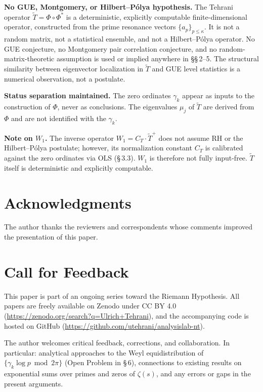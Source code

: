 \documentclass[11pt]{article}
\newcommand{\Tt}{\widetilde{T}}
\newcommand{\CT}{C_{T}}
\newcommand{\Wone}{W_1}
\begin{document}
\textbf{No GUE, Montgomery, or Hilbert--P\'olya hypothesis.}
The Tehrani operator $\Tt = \Phi\circ\Phi^*$ is a deterministic,
explicitly computable finite-dimensional operator, constructed from
the prime resonance vectors $\{a_p\}_{p\le\kappa}$. It is not a random
matrix, not a statistical ensemble, and not a Hilbert--P\'olya
operator. No GUE conjecture, no Montgomery pair correlation conjecture,
and no random-matrix-theoretic assumption is used or implied anywhere
in \S\S\,2--5. The structural similarity between eigenvector
localization in $\Tt$ and GUE level statistics is a numerical
observation, not a postulate.

\textbf{Status separation maintained.}
The zero ordinates $\gamma_k$ appear as inputs to the construction
of $\Phi$, never as conclusions. The eigenvalues $\mu_j$ of $\Tt$
are derived from $\Phi$ and are not identified with the $\gamma_k$.

\textbf{Note on $\Wone$.}
The inverse operator $\Wone = \CT\cdot\Tt^+$ does not assume RH or
the Hilbert--P\'olya postulate; however, its normalization constant
$\CT$ is calibrated against the zero ordinates via OLS (\S\,3.3).
$\Wone$ is therefore not fully input-free. $\Tt$ itself is
deterministic and explicitly computable.

\section*{Acknowledgments}

The author thanks the reviewers and correspondents whose
comments improved the presentation of this paper.

\section*{Call for Feedback}

This paper is part of an ongoing series toward the Riemann Hypothesis.
All papers are freely available on Zenodo under CC BY 4.0
(\url{https://zenodo.org/search?q=Ulrich+Tehrani}),
and the accompanying code is hosted on GitHub
(\url{https://github.com/utehrani/analysislab-nt}).

The author welcomes critical feedback, corrections, and collaboration.
In particular: analytical approaches to the Weyl equidistribution
of $\{\gamma_k\log p\bmod 2\pi\}$ (Open Problem in \S\,6),
connections to existing results on exponential sums
over primes and zeros of $\zeta(s)$,
and any errors or gaps in the present arguments.
\end{document}

